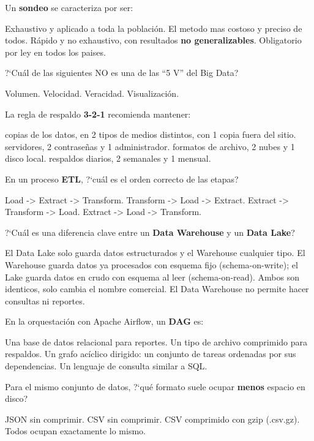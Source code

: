 \documentclass[12pt,addpoints]{exam}
\begin{document}
\begin{questions}
\question[1] Un \textbf{sondeo} se caracteriza por ser:
\begin{choices}
  \choice Exhaustivo y aplicado a toda la poblaci\'on.
  \choice El metodo mas costoso y preciso de todos.
  \CorrectChoice R\'apido y no exhaustivo, con resultados \textbf{no
    generalizables}.
  \choice Obligatorio por ley en todos los paises.
\end{choices}

\question[1] ?`Cu\'al de las siguientes NO es una de las ``5 V'' del Big Data?
\begin{choices}
  \choice Volumen.
  \choice Velocidad.
  \choice Veracidad.
  \CorrectChoice Visualizaci\'on.
\end{choices}

\question[1] La regla de respaldo \textbf{3-2-1} recomienda mantener:
\begin{choices}
   copias de los datos, en 2 tipos de medios distintos, con 1
    copia fuera del sitio.
   servidores, 2 contrase\~nas y 1 administrador.
   formatos de archivo, 2 nubes y 1 disco local.
   respaldos diarios, 2 semanales y 1 mensual.
\end{choices}

\question[1] En un proceso \textbf{ETL}, ?`cu\'al es el orden correcto de las
etapas?
\begin{choices}
  \choice Load -> Extract -> Transform.
  \choice Transform -> Load -> Extract.
  \CorrectChoice Extract -> Transform -> Load.
  \choice Extract -> Load -> Transform.
\end{choices}

\question[1] ?`Cu\'al es una diferencia clave entre un \textbf{Data Warehouse} y
un \textbf{Data Lake}?
\begin{choices}
  \choice El Data Lake solo guarda datos estructurados y el Warehouse cualquier tipo.
  \CorrectChoice El Warehouse guarda datos ya procesados con esquema fijo
    (schema-on-write); el Lake guarda datos en crudo con esquema al leer
    (schema-on-read).
  \choice Ambos son identicos, solo cambia el nombre comercial.
  \choice El Data Warehouse no permite hacer consultas ni reportes.
\end{choices}

\question[1] En la orquestaci\'on con Apache Airflow, un \textbf{DAG} es:
\begin{choices}
  \choice Una base de datos relacional para reportes.
  \choice Un tipo de archivo comprimido para respaldos.
  \CorrectChoice Un grafo ac\'iclico dirigido: un conjunto de tareas ordenadas
    por sus dependencias.
  \choice Un lenguaje de consulta similar a SQL.
\end{choices}

\question[1] Para el mismo conjunto de datos, ?`qu\'e formato suele ocupar
\textbf{menos} espacio en disco?
\begin{choices}
  \choice JSON sin comprimir.
  \choice CSV sin comprimir.
  \CorrectChoice CSV comprimido con gzip (.csv.gz).
  \choice Todos ocupan exactamente lo mismo.
\end{choices}

\end{questions}
\end{document}

